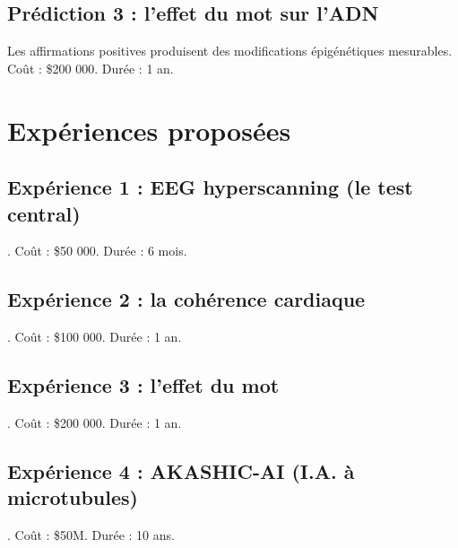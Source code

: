 \documentclass[11pt,a4paper]{article}
\begin{document}
\subsection{Prédiction 3 : l'effet du mot sur l'ADN}
Les affirmations positives produisent des modifications épigénétiques mesurables. Coût : \$200 000. Durée : 1 an.

\section{Expériences proposées}
\subsection{Expérience 1 : EEG hyperscanning (le test central)}. Coût : \$50 000. Durée : 6 mois.
\subsection{Expérience 2 : la cohérence cardiaque}. Coût : \$100 000. Durée : 1 an.
\subsection{Expérience 3 : l'effet du mot}. Coût : \$200 000. Durée : 1 an.
\subsection{Expérience 4 : AKASHIC-AI (I.A. à microtubules)}. Coût : \$50M. Durée : 10 ans.
\end{document}
